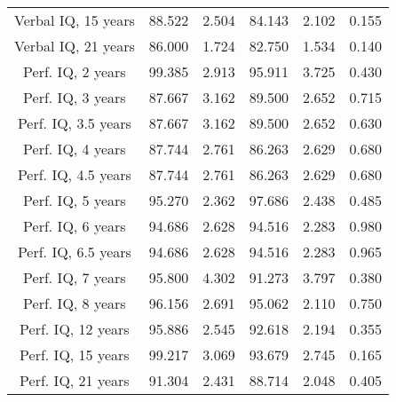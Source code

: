 \begin{longtable}{c c c c c c}
Verbal IQ, 15 years & 88.522 & 2.504 &  84.143 & 2.102 & 0.155 \\
Verbal IQ, 21 years & 86.000 & 1.724 &  82.750 & 1.534 & 0.140 \\
Perf. IQ, 2 years & 99.385 & 2.913 &  95.911 & 3.725 & 0.430 \\
Perf. IQ, 3 years & 87.667 & 3.162 &  89.500 & 2.652 & 0.715 \\
Perf. IQ, 3.5 years & 87.667 & 3.162 &  89.500 & 2.652 & 0.630 \\
Perf. IQ, 4 years & 87.744 & 2.761 &  86.263 & 2.629 & 0.680 \\
Perf. IQ, 4.5 years & 87.744 & 2.761 &  86.263 & 2.629 & 0.680 \\
Perf. IQ, 5 years & 95.270 & 2.362 &  97.686 & 2.438 & 0.485 \\
Perf. IQ, 6 years & 94.686 & 2.628 &  94.516 & 2.283 & 0.980 \\
Perf. IQ, 6.5 years & 94.686 & 2.628 &  94.516 & 2.283 & 0.965 \\
Perf. IQ, 7 years & 95.800 & 4.302 &  91.273 & 3.797 & 0.380 \\
Perf. IQ, 8 years & 96.156 & 2.691 &  95.062 & 2.110 & 0.750 \\
Perf. IQ, 12 years & 95.886 & 2.545 &  92.618 & 2.194 & 0.355 \\
Perf. IQ, 15 years & 99.217 & 3.069 &  93.679 & 2.745 & 0.165 \\
Perf. IQ, 21 years & 91.304 & 2.431 &  88.714 & 2.048 & 0.405 \\
\bottomrule
\end{longtable}
